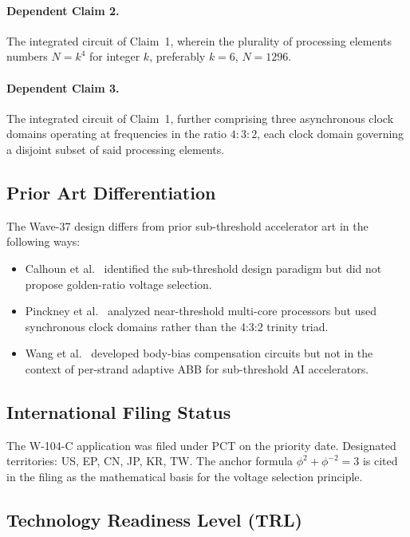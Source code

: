 \paragraph{Dependent Claim 2.} The integrated circuit of Claim~1, wherein the plurality of
processing elements numbers $N = k^4$ for integer $k$, preferably $k=6$, $N=1296$.

\paragraph{Dependent Claim 3.} The integrated circuit of Claim~1, further comprising three
asynchronous clock domains operating at frequencies in the ratio $4:3:2$, each clock domain
governing a disjoint subset of said processing elements.

\subsection{Prior Art Differentiation}

The Wave-37 design differs from prior sub-threshold accelerator art in the following ways:
\begin{itemize}
  \item Calhoun et al.~\cite{calhoun2010} identified the sub-threshold design paradigm but
        did not propose golden-ratio voltage selection.
  \item Pinckney et al.~\cite{pinckney2021} analyzed near-threshold multi-core processors
        but used synchronous clock domains rather than the 4:3:2 trinity triad.
  \item Wang et al.~\cite{wang2019} developed body-bias compensation circuits but not in the
        context of per-strand adaptive ABB for sub-threshold AI accelerators.
\end{itemize}

\subsection{International Filing Status}

The W-104-C application was filed under PCT on the priority date.  Designated territories:
US, EP, CN, JP, KR, TW.  The anchor formula $\phi^2 + \phi^{-2} = 3$ is cited in the
filing as the mathematical basis for the voltage selection principle.

\subsection{Technology Readiness Level (TRL)}

